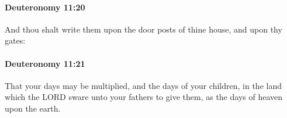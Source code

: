 		\paragraph{Deuteronomy 11:20} %
			\label{DEUTERONOMY-11-20}

			And thou shalt write them upon the door posts of thine house, and upon thy gates:


		\paragraph{Deuteronomy 11:21} %
			\label{DEUTERONOMY-11-21}

			That your days may be multiplied, and the days of your children, in the land which the LORD sware unto your fathers to give them, as the days of heaven upon the earth.


